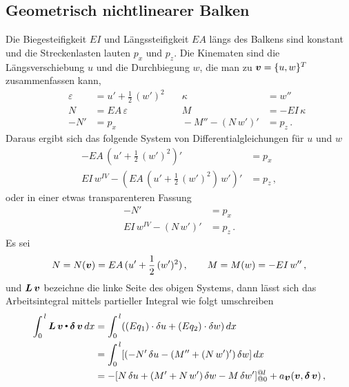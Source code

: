 \textcolor{sectionTitleBlue}{\section{Geometrisch nichtlinearer Balken}}
Die Biegesteifigkeit $EI$ und L\"{a}ngssteifigkeit $EA$ l\"{a}ngs des Balkens sind konstant und die Streckenlasten lauten $p_x$ und $p_z$. Die Kinematen sind die L\"{a}ngsverschiebung $u$ und die Durchbiegung $w$, die man zu $\mbox{\boldmath $v$} = \{u, w\}^T$ zusammenfassen kann,
\begin{subequations}
\begin{alignat}{3}
&& \varepsilon &= u' + \frac{1}{2}\,(w')^2 &\quad \kappa &= w''\\
&&N &= EA\,\varepsilon & \quad M &= - EI\,\kappa \\
&&- N' &= p_x& \quad - M'' - (N\,w')' &= p_z\,.
\end{alignat}
\end{subequations}
Daraus ergibt sich das folgende System von Differentialgleichungen f\"{u}r $u$ und $w$
\begin{subequations}
\begin{align} \label{Eq98}
- EA\,(u' + \frac{1}{2}\, (w')^2)' &= p_x \\
EI\,w^{IV} - (EA\,(u' + \frac{1}{2}\, (w')^2)\,w')' &= p_z\,,
\end{align}
\end{subequations}
oder in einer etwas \glq transparenteren\grq{} Fassung
\begin{subequations}
\begin{align}
- N'\, &= p_x \\
EI\,w^{IV} - (N\,w')' &= p_z\,.
\end{align}
\end{subequations}
Es sei
\begin{align}
N = N(\mbox{\boldmath $v$}) = EA\,(u' + \frac{1}{2}\, (w')^2)\,, \qquad M = M(w) = - EI\,w''\,,
\end{align}
und $\mbox{\boldmath $L$}\,\mbox{\boldmath $v$}$ bezeichne die linke Seite des obigen Systems, dann l\"{a}sst sich das Arbeitsintegral
mittels partieller Integral wie folgt umschreiben
\begin{align}
\int_0^{\,l} \mbox{\boldmath $L$}\,\mbox{\boldmath $v$} {\,\scriptscriptstyle \stackrel{\bullet}{{}}}\, \mbox{\boldmath $\delta$}\,\mbox{\boldmath $v$}\,dx &= \int_0^{\,l} ((Eq_1) \cdot \delta u + (Eq_2) \cdot \delta w)\, dx \nonumber \\
&= \int_0^{\,l} [(- N'\,\delta u - (M'' + (N\,w')')\,\delta w]\,dx \nonumber \\
&= - [ N\,\delta u + (M' + N\,w')\,\delta w - M\,\delta w']_{@0}^{@l} + a_{\mbox{\boldmath $v$}}(\mbox{\boldmath $v$}, \mbox{\boldmath $\delta$}\,\mbox{\boldmath $v$})\,,
\end{align}
